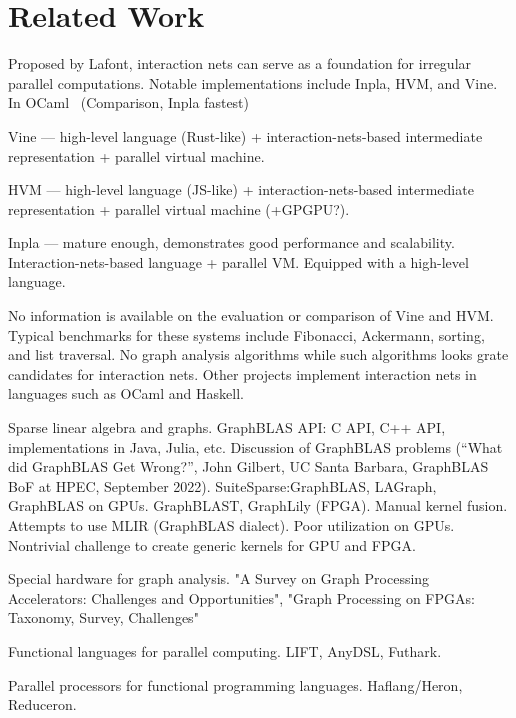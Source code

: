 \section{Related Work}\label{sec:related_work}

 Proposed by Lafont, interaction nets can serve as a foundation for irregular parallel computations.
 Notable implementations include Inpla, HVM, and Vine. In OCaml~\cite{Huber_2025} (Comparison, Inpla fastest)

    Vine --- high-level language (Rust-like) + interaction-nets-based intermediate representation + parallel virtual machine.

    HVM --- high-level language (JS-like) + interaction-nets-based intermediate representation + parallel virtual machine (+GPGPU?).

    Inpla --- mature enough, demonstrates good performance and scalability. Interaction-nets-based language + parallel VM. Equipped with a high-level language.

No information is available on the evaluation or comparison of Vine and HVM.
Typical benchmarks for these systems include Fibonacci, Ackermann, sorting, and list traversal. 
No graph analysis algorithms while such algorithms looks grate candidates for interaction nets.
Other projects implement interaction nets in languages such as OCaml and Haskell.

Sparse linear algebra and graphs.
GraphBLAS API: C API, C++ API, implementations in Java, Julia, etc.
Discussion of GraphBLAS problems (“What did GraphBLAS Get Wrong?”, John Gilbert, UC Santa Barbara, GraphBLAS BoF at HPEC, September 2022).
SuiteSparse:GraphBLAS, LAGraph, GraphBLAS on GPUs. GraphBLAST, GraphLily (FPGA).
Manual kernel fusion. Attempts to use MLIR (GraphBLAS dialect).
Poor utilization on GPUs. Nontrivial challenge to create generic kernels for GPU and FPGA.

Special hardware for graph analysis.
"A Survey on Graph Processing Accelerators: Challenges and Opportunities", "Graph Processing on FPGAs: Taxonomy, Survey, Challenges"

Functional languages for parallel computing.
LIFT, AnyDSL, Futhark.

Parallel processors for functional programming languages.
Haflang/Heron, Reduceron.